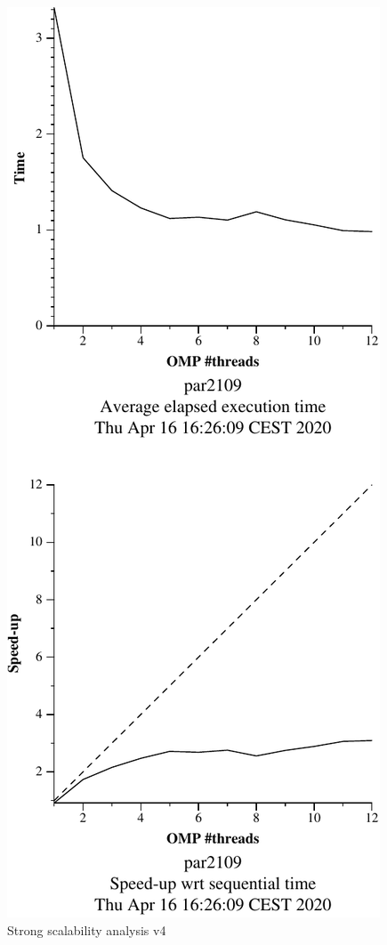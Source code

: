 \begin{figure}[H]
\begin{minipage}{0.5\textwidth}
        \includegraphics[width=0.7\linewidth]{plots/v4-crop.pdf}
        \caption{Strong scalability analysis v4}
        \label{fig:ssa_v4} 
    \end{minipage}
\end{figure}


